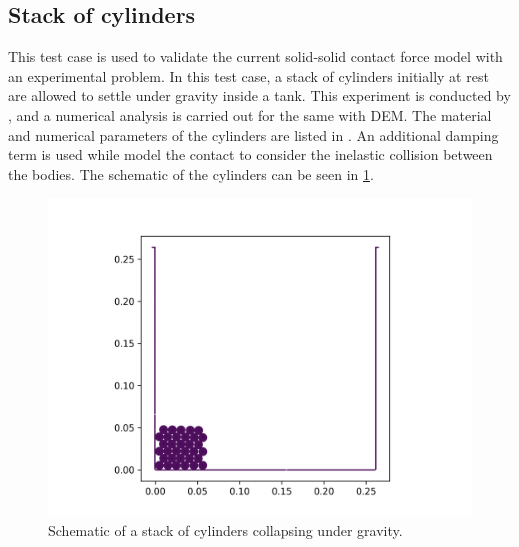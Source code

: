 \FloatBarrier%
\subsection{Stack of cylinders}
\label{sec:stack-of-cylinders}
This test case is used to validate the current solid-solid contact force model
with an experimental problem. In this test case, a stack of cylinders initially
at rest are allowed to settle under gravity inside a tank. This experiment is
conducted by \citep{zhang_simulation_2009}, and a numerical analysis is carried
out for the same with DEM. The material and numerical parameters of the
cylinders are listed in . An additional damping
term is used while model the contact to consider the inelastic collision between
the bodies. The schematic of the cylinders can be seen in
\cref{fig:schematic:stack-of-cylinders}.
\begin{figure}[!htpb]
  \centering
  \includegraphics[scale=0.5]{figures/rfc/figures/stack_of_cylinders_2d/Mohseni_Vyas/time0}
  \caption{Schematic of a stack of cylinders collapsing under gravity.}
  \label{fig:schematic:stack-of-cylinders}
\end{figure}

